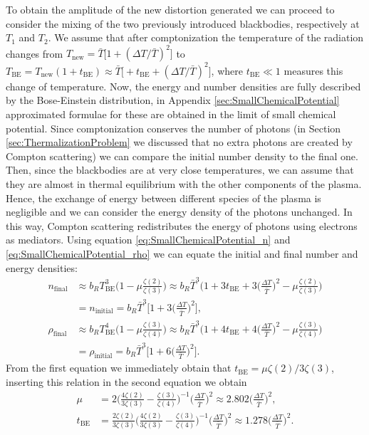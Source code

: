 To obtain the amplitude of the new distortion generated we can proceed to consider the mixing of the two previously introduced blackbodies, respectively at $T_1$ and $T_2$. We assume that after comptonization the temperature of the radiation changes from $T_\text{new}=\bar T\big[1+(\Delta T/\bar T)^2\big]$ to $T_\text{BE}=T_\text{new}(1+t_\text{BE})\approx\bar T\big[+t_\text{BE}+(\Delta T/\bar T)^2\big]$, where $t_\text{BE}\ll1$ measures this change of temperature. 
Now, the energy and number densities are fully described by the Bose-Einstein distribution, in Appendix \ref{sec:SmallChemicalPotential} approximated formulae for these are obtained in the limit of small chemical potential. Since comptonization conserves the number of photons (in Section \ref{sec:ThermalizationProblem} we discussed that no extra photons are created by Compton scattering) we can compare the initial number density to the final one. Then, since the blackbodies are at very close temperatures, we can assume that they are almost in thermal equilibrium with the other components of the plasma. Hence, the exchange of energy between different species of the plasma is negligible and we can consider the energy density of the photons unchanged. In this way, Compton scattering redistributes the energy of photons using electrons as mediators. Using equation \eqref{eq:SmallChemicalPotential_n} and \eqref{eq:SmallChemicalPotential_rho} we can equate the initial and final number and energy densities:
\begin{align*}
    n_\text{final}&\approx b_R T^3_\text{BE}\bigg(1-\mu\frac{\zeta(2)}{\zeta(3)}\bigg)\approx b_R \bar T^3\bigg(1+3t_\text{BE}+3\bigg(\frac{\Delta T}{\bar T}\bigg)^2-\mu\frac{\zeta(2)}{\zeta(3)}\bigg)\\
    &=n_\text{initial}=b_R\bar T^3\bigg[1+3\bigg(\frac{\Delta T}{\bar T}\bigg)^2\bigg],\\
    \rho_\text{final}&\approx b_R T^4_\text{BE}\bigg(1-\mu\frac{\zeta(3)}{\zeta(4)}\bigg)\approx b_R \bar T^3\bigg(1+4t_\text{BE}+4\bigg(\frac{\Delta T}{\bar T}\bigg)^2-\mu\frac{\zeta(3)}{\zeta(4)}\bigg)\\
    &=\rho_\text{initial}=b_R\bar T^3\bigg[1+6\bigg(\frac{\Delta T}{\bar T}\bigg)^2\bigg].
\end{align*}
From the first equation we immediately obtain that $t_\text{BE}= \mu{\zeta(2)}/{3\zeta(3)}$, inserting this relation in the second equation we obtain
\begin{align}
    \mu&=2\bigg(\frac{4\zeta(2)}{3\zeta(3)}-\frac{\zeta(3)}{\zeta(4)}\bigg)^{-1}\bigg(\frac{\Delta T}{\bar T}\bigg)^2\approx2.802\bigg(\frac{\Delta T}{\bar T}\bigg)^2,\label{eq:mu_MixingBB}\\
    t_\text{BE}&=\frac{2\zeta(2)}{3\zeta(3)}\bigg(\frac{4\zeta(2)}{3\zeta(3)}-\frac{\zeta(3)}{\zeta(4)}\bigg)^{-1}\bigg(\frac{\Delta T}{\bar T}\bigg)^2\approx1.278\bigg(\frac{\Delta T}{\bar T}\bigg)^2.\label{eq:t_BE_MixingBB}
\end{align}
